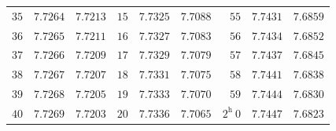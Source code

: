 \begin{center}
{{\begin{minipage}{.83\linewidth}
\begin{tabular}{r|r|r||r|r|r||r|r|r}
$35$ & $7.7264$ & $7.7213$ & $15$ & $7.7325$ & $7.7088$ & $55$ & $7.7431$ & $7.6859$\\[1.15pt]
$36$ & $7.7265$ & $7.7211$ & $16$ & $7.7327$ & $7.7083$ & $56$ & $7.7434$ & $7.6852$\\
$37$ & $7.7266$ & $7.7209$ & $17$ & $7.7329$ & $7.7079$ & $57$ & $7.7437$ & $7.6845$\\
$38$ & $7.7267$ & $7.7207$ & $18$ & $7.7331$ & $7.7075$ & $58$ & $7.7441$ & $7.6838$\\
$39$ & $7.7268$ & $7.7205$ & $19$ & $7.7333$ & $7.7070$ & $59$ & $7.7444$ & $7.6830$\\
$40$ & $7.7269$ & $7.7203$ & $20$ & $7.7336$ & $7.7065$ & $2^{\mathrm h}\ 0$ & $7.7447$ & $7.6823$\\
\end{tabular}
\endgroup
\end{minipage}}}\endgroup
\end{center}
\clearpage{}%
